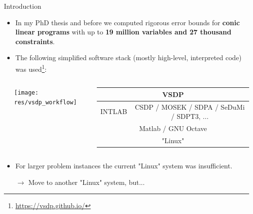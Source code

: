 \documentclass[xcolor=svgnames,xcolor=table,aspectratio=169]{beamer}
\begin{document}
\begin{frame}{Introduction}
\begin{itemize}
\itemsep1em
\item
In my PhD thesis and before \cite{Ohlhus2019,Chaykin2016} we computed
rigorous error bounds for \textbf{conic linear programs} with up to
\textbf{19 million variables and 27 thousand constraints}.

\item
The following simplified software stack (mostly high-level, interpreted code)
was used\footnote{\url{https://vsdp.github.io/}}:
\end{itemize}
\begin{columns}
\begin{column}{0.05\textwidth}
\end{column}
\begin{column}{0.45\textwidth}
\texttt{[image: res/vsdp\_workflow]}
\end{column}
\begin{column}{0.45\textwidth}\tiny
\begin{tabular}{|c|c|}
\hline
\multicolumn{2}{|c|}{\cellcolor{orange!20}VSDP} \\
\hline
\cellcolor{orange!20}INTLAB
& \cellcolor{red!20}CSDP / MOSEK / SDPA / SeDuMi / SDPT3, ... \\
\hline
\multicolumn{2}{|c|}{Matlab / GNU Octave} \\
\hline
\multicolumn{2}{|c|}{"Linux"} \\
\hline
\end{tabular}
\end{column}
\end{columns}
\begin{itemize}
\itemsep1em
\item
For larger problem instances the current "Linux" system was insufficient.

$\rightarrow$ Move to another "Linux" system, but...
\end{itemize}
\end{frame}
\end{document}
